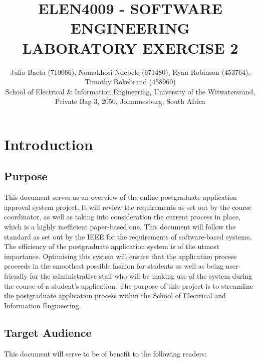 \documentclass[journal,comsoc,onecolumn]{IEEEtran}
\begin{document}
\title{ELEN4009 - SOFTWARE ENGINEERING\\ LABORATORY EXERCISE 2}

\author{\vspace{3mm} Julio Baeta (710066), Nomakhosi Ndebele (671480), Ryan Robinson (453764), Timothy Rokebrand (458960)\\ \small \vspace{2mm} School of Electrical \& Information Engineering, University of the Witwatersrand, Private Bag 3, 2050, Johannesburg, South Africa
}

\markboth{}{}

\maketitle

\thispagestyle{empty}
\pagestyle{empty}

\IEEEpeerreviewmaketitle


\section{Introduction}

\subsection{Purpose}
This document serves as an overview of the online postgraduate application approval system project. It will review the requirements as set out by the course coordinator, as well as taking into consideration the current process in place, which is a highly inefficient paper-based one. This document will follow the standard as set out by the IEEE for the requirements of software-based systems.
The efficiency of the postgraduate application system is of the utmost importance. Optimising this system will ensure that the application process proceeds in the smoothest possible fashion for students as well as being user-friendly for the administrative staff who will be making use of the system during the course of a student’s application.
The purpose of this project is to streamline the postgraduate application process within the School of Electrical and Information Engineering.

\subsection{Target Audience}
This document will serve to be of benefit to the following readers:
\end{document}
